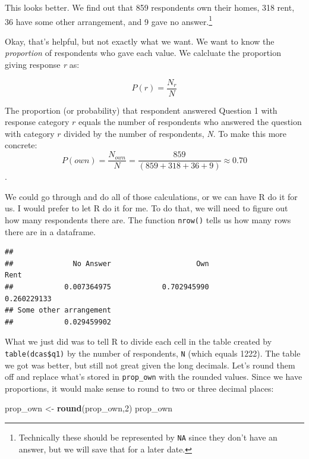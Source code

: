 \documentclass[]{article}
\newenvironment{Shaded}{\begin{snugshade}}{\end{snugshade}}
\newcommand{\KeywordTok}[1]{\textcolor[rgb]{0.13,0.29,0.53}{\textbf{{#1}}}}
\newcommand{\DecValTok}[1]{\textcolor[rgb]{0.00,0.00,0.81}{{#1}}}
\newcommand{\StringTok}[1]{\textcolor[rgb]{0.31,0.60,0.02}{{#1}}}
\newcommand{\NormalTok}[1]{{#1}}
\let\rmarkdownfootnote\footnote%
\def\footnote{\protect\rmarkdownfootnote}
\begin{document}
This looks better. We find out that 859 respondents own their homes, 318
rent, 36 have some other arrangement, and 9 gave no answer.\footnote{Technically
  these should be represented by \texttt{NA} since they don't have an
  answer, but we will save that for a later date.}

Okay, that's helpful, but not exactly what we want. We want to know the
\emph{proportion} of respondents who gave each value. We calcluate the
proportion giving response \emph{r} as:

\[P(r) = \frac{N_r}{N}\]

The proportion (or probability) that respondent answered Question 1 with
response category \(r\) equals the number of respondents who answered
the question with category \(r\) divided by the number of respondents,
\emph{N}. To make this more concrete:
\[P(own)=\frac{N_{own}}{N}=\frac{859}{(859+318+36+9)}\approx0.70\].

We could go through and do all of those calculations, or we can have R
do it for us. I would prefer to let R do it for me. To do that, we will
need to figure out how many respondents there are. The function
\texttt{nrow()} tells us how many rows there are in a dataframe.

\begin{Shaded}
\end{Shaded}

\begin{verbatim}
## 
##              No Answer                    Own                   Rent 
##            0.007364975            0.702945990            0.260229133 
## Some other arrangement 
##            0.029459902
\end{verbatim}

What we just did was to tell R to divide each cell in the table created
by \texttt{table(dcas\$q1)} by the number of respondents, \texttt{N}
(which equals 1222). The table we got was better, but still not great
given the long decimals. Let's round them off and replace what's stored
in \texttt{prop\_own} with the rounded values. Since we have
proportions, it would make sense to round to two or three decimal
places:

\begin{Shaded}
\begin{Highlighting}[]
\NormalTok{prop_own <-}\StringTok{ }\KeywordTok{round}\NormalTok{(prop_own,}\DecValTok{2}\NormalTok{)}
\NormalTok{prop_own}
\end{Highlighting}
\end{Shaded}
\end{document}
